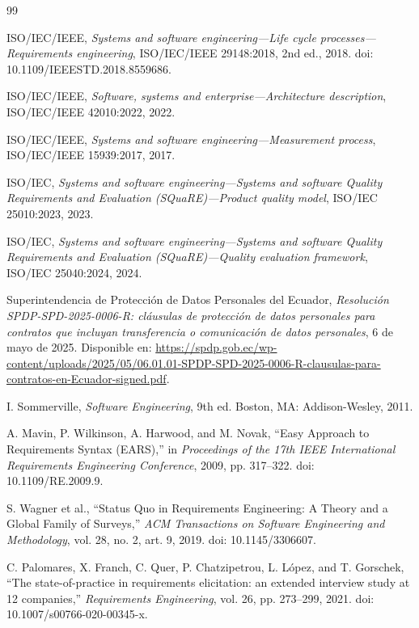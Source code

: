 \clearpage
{}
{}
\begin{thebibliography}{99}

ISO/IEC/IEEE,
\emph{Systems and software engineering---Life cycle processes---Requirements engineering},
ISO/IEC/IEEE 29148:2018, 2nd ed., 2018.
doi: 10.1109/IEEESTD.2018.8559686.

ISO/IEC/IEEE,
\emph{Software, systems and enterprise---Architecture description},
ISO/IEC/IEEE 42010:2022, 2022.

ISO/IEC/IEEE,
\emph{Systems and software engineering---Measurement process},
ISO/IEC/IEEE 15939:2017, 2017.

ISO/IEC,
\emph{Systems and software engineering---Systems and software Quality Requirements and Evaluation (SQuaRE)---Product quality model},
ISO/IEC 25010:2023, 2023.

ISO/IEC,
\emph{Systems and software engineering---Systems and software Quality Requirements and Evaluation (SQuaRE)---Quality evaluation framework},
ISO/IEC 25040:2024, 2024.

Superintendencia de Protección de Datos Personales del Ecuador,
\emph{Resolución SPDP-SPD-2025-0006-R: cláusulas de protección de datos personales para contratos que incluyan transferencia o comunicación de datos personales},
6 de mayo de 2025.
Disponible en: \url{https://spdp.gob.ec/wp-content/uploads/2025/05/06.01.01-SPDP-SPD-2025-0006-R-clausulas-para-contratos-en-Ecuador-signed.pdf}.

I. Sommerville,
\emph{Software Engineering}, 9th ed.
Boston, MA: Addison-Wesley, 2011.

A. Mavin, P. Wilkinson, A. Harwood, and M. Novak,
“Easy Approach to Requirements Syntax (EARS),”
in \emph{Proceedings of the 17th IEEE International Requirements Engineering Conference},
2009, pp. 317--322.
doi: 10.1109/RE.2009.9.

S. Wagner et al.,
“Status Quo in Requirements Engineering: A Theory and a Global Family of Surveys,”
\emph{ACM Transactions on Software Engineering and Methodology},
vol. 28, no. 2, art. 9, 2019.
doi: 10.1145/3306607.

C. Palomares, X. Franch, C. Quer, P. Chatzipetrou, L. López, and T. Gorschek,
“The state-of-practice in requirements elicitation: an extended interview study at 12 companies,”
\emph{Requirements Engineering}, vol. 26, pp. 273--299, 2021.
doi: 10.1007/s00766-020-00345-x.


\end{thebibliography}
